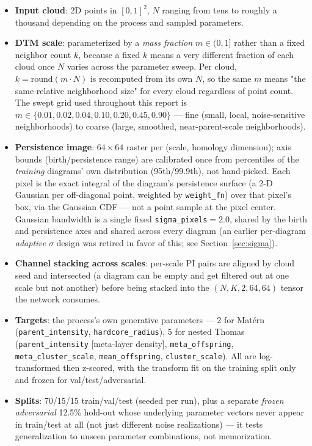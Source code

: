 \documentclass[11pt]{article}
\begin{document}
\begin{itemize}
  \item \textbf{Input cloud}: 2D points in $[0,1]^2$, $N$ ranging from tens to
    roughly a thousand depending on the process and sampled parameters.
  \item \textbf{DTM scale}: parameterized by a \emph{mass fraction} $m \in (0,1]$
    rather than a fixed neighbor count $k$, because a fixed $k$ means a very
    different fraction of each cloud once $N$ varies across the parameter sweep.
    Per cloud, $k = \mathrm{round}(m \cdot N)$ is recomputed from its own $N$, so
    the same $m$ means "the same relative neighborhood size" for every cloud
    regardless of point count. The swept grid used throughout this report is
    $m \in \{0.01, 0.02, 0.04, 0.10, 0.20, 0.45, 0.90\}$ — fine (small, local,
    noise-sensitive neighborhoods) to coarse (large, smoothed, near-parent-scale
    neighborhoods).
  \item \textbf{Persistence image}: $64\times64$ raster per (scale, homology
    dimension); axis bounds (birth/persistence range) are calibrated once from
    percentiles of the \emph{training} diagrams' own distribution (95th/99.9th),
    not hand-picked. Each pixel is the exact integral of the diagram's
    persistence surface (a 2-D Gaussian per off-diagonal point, weighted by
    \texttt{weight\_fn}) over that pixel's box, via the Gaussian CDF — not a
    point sample at the pixel center. Gaussian bandwidth is a single fixed
    \texttt{sigma\_pixels}$=2.0$, shared by the birth and persistence axes and
    shared across every diagram (an earlier per-diagram \emph{adaptive}
    $\sigma$ design was retired in favor of this; see
    Section~\ref{sec:sigma}).
  \item \textbf{Channel stacking across scales}: per-scale PI pairs are aligned by
    cloud seed and intersected (a diagram can be empty and get filtered out at one
    scale but not another) before being stacked into the $(N, K, 2, 64, 64)$ tensor
    the network consumes.
  \item \textbf{Targets}: the process's own generative parameters — 2 for Matérn
    (\texttt{parent\_intensity}, \texttt{hardcore\_radius}), 5 for nested Thomas
    (\texttt{parent\_intensity} [meta-layer density], \texttt{meta\_offspring},
    \texttt{meta\_cluster\_scale}, \texttt{mean\_offspring}, \texttt{cluster\_scale}).
    All are log-transformed then z-scored, with the transform fit on the training
    split only and frozen for val/test/adversarial.
  \item \textbf{Splits}: 70/15/15 train/val/test (seeded per run), plus a separate
    \emph{frozen adversarial} 12.5\% hold-out whose underlying parameter vectors
    never appear in train/test at all (not just different noise realizations) —
    it tests generalization to unseen parameter combinations, not memorization.
\end{itemize}
\end{document}
